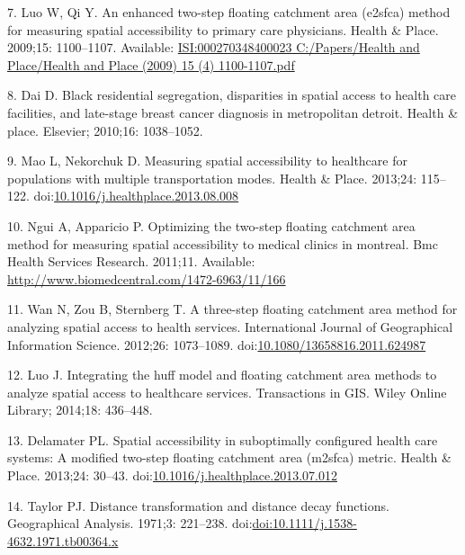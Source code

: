 \documentclass[10pt,letterpaper]{article}
\begin{document}
\hypertarget{ref-Luo2009}{}
7. Luo W, Qi Y. An enhanced two-step floating catchment area (e2sfca)
method for measuring spatial accessibility to primary care physicians.
Health \& Place. 2009;15: 1100--1107. Available:
\href{ISI:000270348400023\%0AC:/Papers/Health\%20and\%20Place/Health\%20and\%20Place\%20(2009)\%2015\%20(4)\%201100-1107.pdf}{ISI:000270348400023
C:/Papers/Health and Place/Health and Place (2009) 15 (4) 1100-1107.pdf}

\hypertarget{ref-Dai2010}{}
8. Dai D. Black residential segregation, disparities in spatial access
to health care facilities, and late-stage breast cancer diagnosis in
metropolitan detroit. Health \& place. Elsevier; 2010;16: 1038--1052.

\hypertarget{ref-Mao2013}{}
9. Mao L, Nekorchuk D. Measuring spatial accessibility to healthcare for
populations with multiple transportation modes. Health \& Place.
2013;24: 115--122.
doi:\href{https://doi.org/10.1016/j.healthplace.2013.08.008}{10.1016/j.healthplace.2013.08.008}

\hypertarget{ref-Ngui2011}{}
10. Ngui A, Apparicio P. Optimizing the two-step floating catchment area
method for measuring spatial accessibility to medical clinics in
montreal. Bmc Health Services Research. 2011;11. Available:
\url{http://www.biomedcentral.com/1472-6963/11/166}

\hypertarget{ref-Wan2012}{}
11. Wan N, Zou B, Sternberg T. A three-step floating catchment area
method for analyzing spatial access to health services. International
Journal of Geographical Information Science. 2012;26: 1073--1089.
doi:\href{https://doi.org/10.1080/13658816.2011.624987}{10.1080/13658816.2011.624987}

\hypertarget{ref-Luo2014}{}
12. Luo J. Integrating the huff model and floating catchment area
methods to analyze spatial access to healthcare services. Transactions
in GIS. Wiley Online Library; 2014;18: 436--448.

\hypertarget{ref-Delamater2013}{}
13. Delamater PL. Spatial accessibility in suboptimally configured
health care systems: A modified two-step floating catchment area
(m2sfca) metric. Health \& Place. 2013;24: 30--43.
doi:\href{https://doi.org/10.1016/j.healthplace.2013.07.012}{10.1016/j.healthplace.2013.07.012}

\hypertarget{ref-Taylor1971}{}
14. Taylor PJ. Distance transformation and distance decay functions.
Geographical Analysis. 1971;3: 221--238.
doi:\href{https://doi.org/doi:10.1111/j.1538-4632.1971.tb00364.x}{doi:10.1111/j.1538-4632.1971.tb00364.x}
\end{document}
